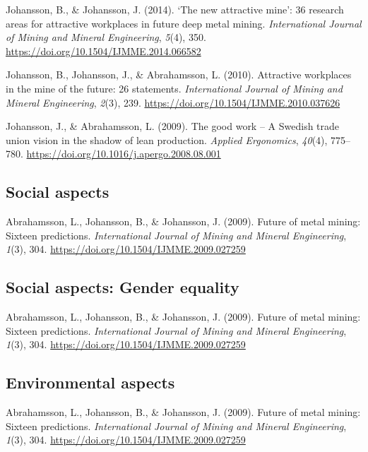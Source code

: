 \documentclass[
  12pt,
]{scrbook}
\begin{document}
Johansson, B., \& Johansson, J. (2014). `The new attractive mine': 36
research areas for attractive workplaces in future deep metal mining.
\emph{International Journal of Mining and Mineral Engineering}, \emph{5}(4), 350.
\url{https://doi.org/10.1504/IJMME.2014.066582}

Johansson, B., Johansson, J., \& Abrahamsson, L. (2010). Attractive
workplaces in the mine of the future: 26 statements. \emph{International
Journal of Mining and Mineral Engineering}, \emph{2}(3), 239.
\url{https://doi.org/10.1504/IJMME.2010.037626}

Johansson, J., \& Abrahamsson, L. (2009). The good work -- A Swedish
trade union vision in the shadow of lean production. \emph{Applied
Ergonomics}, \emph{40}(4), 775--780.
\url{https://doi.org/10.1016/j.apergo.2008.08.001}

\hypertarget{social-aspects-1}{%
\subsection*{Social aspects}\label{social-aspects-1}}

Abrahamsson, L., Johansson, B., \& Johansson, J. (2009). Future of metal
mining: Sixteen predictions. \emph{International Journal of Mining and
Mineral Engineering}, \emph{1}(3), 304.
\url{https://doi.org/10.1504/IJMME.2009.027259}

\hypertarget{social-aspects-gender-equality-1}{%
\subsection*{Social aspects: Gender equality}\label{social-aspects-gender-equality-1}}

Abrahamsson, L., Johansson, B., \& Johansson, J. (2009). Future of metal
mining: Sixteen predictions. \emph{International Journal of Mining and
Mineral Engineering}, \emph{1}(3), 304.
\url{https://doi.org/10.1504/IJMME.2009.027259}

\hypertarget{environmental-aspects-1}{%
\subsection*{Environmental aspects}\label{environmental-aspects-1}}

Abrahamsson, L., Johansson, B., \& Johansson, J. (2009). Future of metal
mining: Sixteen predictions. \emph{International Journal of Mining and
Mineral Engineering}, \emph{1}(3), 304.
\url{https://doi.org/10.1504/IJMME.2009.027259}
\end{document}

